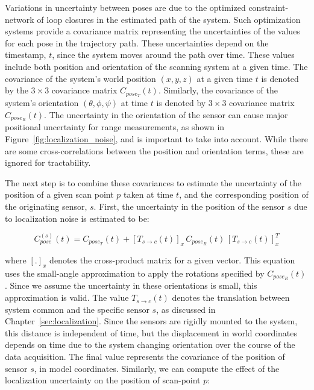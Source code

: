 \documentclass[12pt,onecolumn,oneside]{book}
\begin{document}
Variations in uncertainty between poses are due to the optimized constraint-network of loop closures in the estimated path of the system.  Such optimization systems provide a covariance matrix representing the uncertainties of the values for each pose in the trajectory path.  These uncertainties depend on the timestamp, $t$, since the system moves around the path over time.  These values include both position and orientation of the scanning system at a given time.  The covariance of the system's world position $(x,y,z)$ at a given time $t$ is denoted by the $3 \times 3$ covariance matrix $C_{pose_T}(t)$.  Similarly, the covariance of the system's orientation $(\theta,\phi,\psi)$ at time $t$ is denoted by $3 \times 3$ covariance matrix $C_{pose_R}(t)$.  The uncertainty in the orientation of the sensor can cause major positional uncertainty for range measurements, as shown in Figure~\ref{fig:localization_noise}, and is important to take into account.  While there are some cross-correlations between the position and orientation terms, these are ignored for tractability.  

The next step is to combine these covariances to estimate the uncertainty of the position of a given scan point $p$ taken at time $t$, and the corresponding position of the originating sensor, $s$.  First, the uncertainty in the position of the sensor $s$ due to localization noise is estimated to be:

\begin{equation}
C^{(s)}_{pose}(t) = C_{pose_T}(t) + \left[ T_{s\rightarrow c}(t) \right]_x \, C_{pose_R}(t) \, \left[ T_{s\rightarrow c}(t) \right]_x^T
\end{equation}

where $\left[.\right]_x$ denotes the cross-product matrix for a given vector.  This equation uses the small-angle approximation to apply the rotations specified by $C_{pose_R}(t)$.  Since we assume the uncertainty in these orientations is small, this approximation is valid.  The value $T_{s\rightarrow c}(t)$ denotes the translation between system common and the specific sensor $s$, as discussed in Chapter~\ref{sec:localization}.  Since the sensors are rigidly mounted to the system, this distance is independent of time, but the displacement in world coordinates depends on time due to the system changing orientation over the course of the data acquisition.  The final value represents the covariance of the position of sensor $s$, in model coordinates.  Similarly, we can compute the effect of the localization  uncertainty on the position of scan-point $p$:
\end{document}
